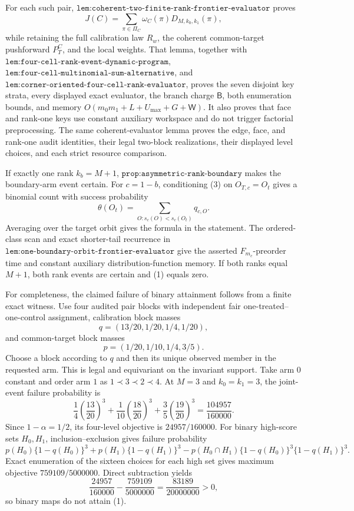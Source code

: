 For each such pair, \(\texttt{lem:coherent-two-finite-rank-frontier-evaluator}\) proves
\[
J(C)=\sum_{\pi\in\Pi_C}\omega_C(\pi)D_{M,k_0,k_1}(\pi),
\tag{4}
\]
while retaining the full calibration law \(R_w\), the coherent common-target pushforward \(P_T^C\), and the local weights. That lemma, together with \(\texttt{lem:four-cell-rank-event-dynamic-program}\), \(\texttt{lem:four-cell-multinomial-sum-alternative}\), and \(\texttt{lem:corner-oriented-four-cell-rank-evaluator}\), proves the seven disjoint key strata, every displayed exact evaluator, the branch charge \(\mathsf B\), both enumeration bounds, and memory \(O(m_0m_1+L+U_{\max}+G+\mathsf W)\). It also proves that face and rank-one keys use constant auxiliary workspace and do not trigger factorial preprocessing. The same coherent-evaluator lemma proves the edge, face, and rank-one audit identities, their legal two-block realizations, their displayed level choices, and each strict resource comparison.

If exactly one rank \(k_b=M+1\), \(\texttt{prop:asymmetric-rank-boundary}\) makes the boundary-arm event certain. For \(c=1-b\), conditioning (3) on \(O_{T,c}=O_t\) gives a binomial count with success probability
\[
\theta(O_t)=\sum_{O:s_c(O)<s_c(O_t)}q_{c,O}.
\]
Averaging over the target orbit gives the formula in the statement. The ordered-class scan and exact shorter-tail recurrence in \(\texttt{lem:one-boundary-orbit-frontier-evaluator}\) give the asserted \(F_{m_c}\)-preorder time and constant auxiliary distribution-function memory. If both ranks equal \(M+1\), both rank events are certain and (1) equals zero.

For completeness, the claimed failure of binary attainment follows from a finite exact witness. Use four audited pair blocks with independent fair one-treated--one-control assignment, calibration block masses
\[
q=(13/20,1/20,1/4,1/20),
\]
and common-target block masses
\[
p=(1/20,1/10,1/4,3/5).
\]
Choose a block according to \(q\) and then its unique observed member in the requested arm. This is legal and equivariant on the invariant support. Take arm \(0\) constant and order arm \(1\) as \(1\prec3\prec2\prec4\). At \(M=3\) and \(k_0=k_1=3\), the joint-event failure probability is
\[
\frac14\left(\frac{13}{20}\right)^3
+\frac1{10}\left(\frac{18}{20}\right)^3
+\frac35\left(\frac{19}{20}\right)^3
=\frac{104957}{160000}.
\]
Since \(1-\alpha=1/2\), its four-level objective is \(24957/160000\). For binary high-score sets \(H_0,H_1\), inclusion--exclusion gives failure probability
\[
p(H_0)\{1-q(H_0)\}^3+p(H_1)\{1-q(H_1)\}^3
-p(H_0\cap H_1)\{1-q(H_0)\}^3\{1-q(H_1)\}^3.
\tag{5}
\]
Exact enumeration of the sixteen choices for each high set gives maximum objective \(759109/5000000\). Direct subtraction yields
\[
\frac{24957}{160000}-\frac{759109}{5000000}
=\frac{83189}{20000000}>0,
\]
so binary maps do not attain (1).

